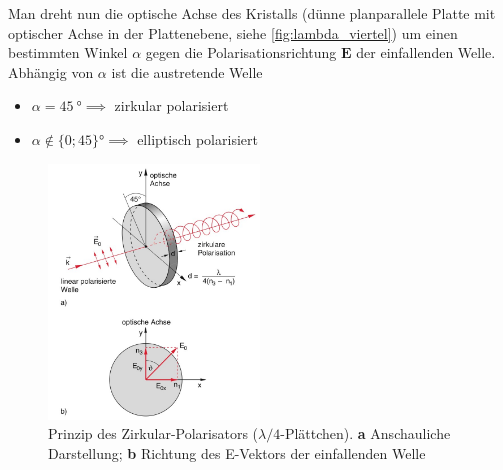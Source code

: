 \documentclass[a4paper, 11pt, ngerman, parskip=half-]{scrartcl}
\begin{document}
Man dreht nun die optische Achse des Kristalls (dünne planparallele Platte mit optischer Achse in der Plattenebene, siehe \autoref{fig:lambda_viertel}) um einen bestimmten Winkel $\alpha$ gegen die Polarisationsrichtung $\textbf{E}$ der einfallenden Welle. Abhängig von $\alpha$ ist die austretende Welle
\begin{itemize}
    \item $\alpha = \SI{45}{\degree} \implies$ zirkular polarisiert
    \item $\alpha \notin \{0;45\}\si{\degree} \implies$ elliptisch polarisiert
\end{itemize}
%
\begin{figure}[!h]
    \centering
    \begin{samepage}
        \includegraphics[width=0.5\textwidth]{image/15/lambda_viertel.jpg}
        \caption{Prinzip des Zirkular-Polarisators ($\lambda/4$-Plättchen). \textbf{a} Anschauliche Darstellung; \textbf{b} Richtung des E-Vektors der einfallenden Welle}
        \label{fig:lambda_viertel}
    \end{samepage}
\end{figure}
\end{document}
